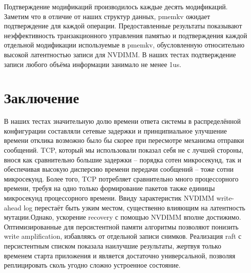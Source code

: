 \documentclass[pdftex,ptm,12pt,a4paper]{report}
\theoremstyle{definition}
\begin{document}
Подтверждение модификаций производилось каждые десять модификаций. Заметим что в отличие от наших структур данных, pmemkv ожидает подтверждение для каждой операции.
Предоставленные результаты показывают неэффективность транзакционного управления памятью и подтверждения каждой отдельной модификации используемые в pmemkv, обусловленную
относительно высокой латентностью записи для NVDIMM. В наших тестах подтверждение записи любого объёма информации занимало не менее 1us.

\chapter{Заключение}
В наших тестах значительную долю времени ответа системы в распределённой конфигурации составляли сетевые задержки и принципиальное улучшение времени отклика возможно было бы скорее при
пересмотре механизма отправки сообщений. TCP, который мы использовали показал себя не с лучшей стороны, внося как сравнительно большие задержки -- порядка сотен микросекунд, так
и обеспечивая высокую дисперсию времени передачи сообщений -- тоже сотни микросекунд. Более того, TCP потребляет сравнительно много процессорного времени, требуя на одно только
формирование пакетов также единицы микросекунд процессорного времени. Ввиду характеристик NVDIMM write-ahead log перестаёт быть узким местом, существенно влияющим на латентность мутации.Однако, ускорение recovery с помощью NVDIMM вполне достижимо. Оптимизированные для персистентной памяти алгоритмы позволяют понизить write amplification, избавляясь от отдельной записи снимков.
Реализация raft с персистентным списком показала наилучшие результаты, жертвуя только временем старта приложения и является достаточно универсальной, позволяя реплицировать сколь угодно сложно устроенное состояние.




\end{document}

